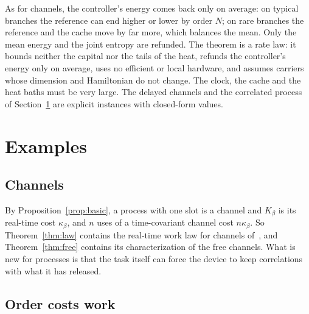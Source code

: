 \documentclass[11pt]{article}
\theoremstyle{definition}
\theoremstyle{remark}
\newcommand{\Kb}{K_\beta}
\newcommand{\Trt}{\kappa_\beta}
\begin{document}
As for channels, the controller's energy comes back only on average: on typical branches the reference can end higher or lower by order $N$; on rare branches the reference and the cache move by far more, which balances the mean. Only the mean energy and the joint entropy are refunded. The theorem is a rate law: it bounds neither the capital nor the tails of the heat, refunds the controller's energy only on average, uses no efficient or local hardware, and assumes carriers whose dimension and Hamiltonian do not change. The clock, the cache and the heat baths must be very large. The delayed channels and the correlated process of Section~\ref{sec:examples} are explicit instances with closed-form values.

\section{Examples}\label{sec:examples}

\subsection{Channels}

By Proposition~\ref{prop:basic}, a process with one slot is a channel and $\Kb$ is its real-time cost $\Trt$, and $n$ uses of a time-covariant channel cost $n\Trt$. So Theorem~\ref{thm:law} contains the real-time work law for channels of~\cite{SaveWork}, and Theorem~\ref{thm:free} contains its characterization of the free channels. What is new for processes is that the task itself can force the device to keep correlations with what it has released.

\subsection{Order costs work}
\end{document}
